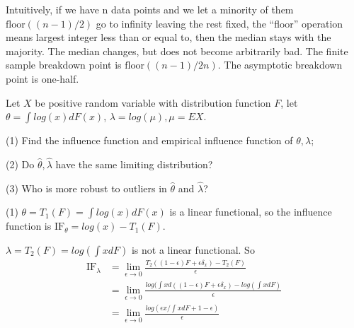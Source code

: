 \begin{solution}
Intuitively\citep{Charles2006}, if we have n data points and we let a minority of them $\text{floor}((n - 1)/2)$ go to infinity leaving the rest fixed, the ``floor'' operation means largest integer less than or equal to, then the median stays with the majority. The median changes, but does not become arbitrarily bad. The finite sample breakdown point is $\text{floor}((n - 1)/2n)$. The asymptotic breakdown point is one-half.
\end{solution}

\begin{problem}
    Let $X$ be positive random variable with distribution function $F$, let $\theta = \int log(x) d F(x)$, $\lambda = log (\mu), \mu = EX$. 

    (1) Find the influence function and empirical influence function of $\theta,\lambda$;

    (2) Do $\hat\theta,\hat\lambda$ have the same limiting distribution?

    (3) Who is more robust to outliers in $\hat\theta$ and $\hat\lambda$?
\end{problem}

\begin{solution}
    (1) $\theta = T_1(F) = \int log(x) d F(x)$ is a linear functional, so the influence function is $\text{IF}_\theta = log(x) - T_1(F)$.

    $\lambda = T_2(F) = log(\int x dF)$ is not a linear functional. So 
    \begin{equation*}
        \begin{split}
            \text{IF}_\lambda & = \lim_{\epsilon\to0} \frac{T_2((1-\epsilon)F + \epsilon \delta_x) - T_2(F)}{\epsilon} \\
            & = \lim_{\epsilon\to0}  \frac{log(\int x d ((1-\epsilon)F + \epsilon \delta_x) - log(\int x dF)}{\epsilon} \\
            & = \lim_{\epsilon\to0}  \frac{log \left( \epsilon  x /\int x dF + 1-\epsilon \right)}{\epsilon} \\
        \end{split}
    \end{equation*}

\end{solution}


